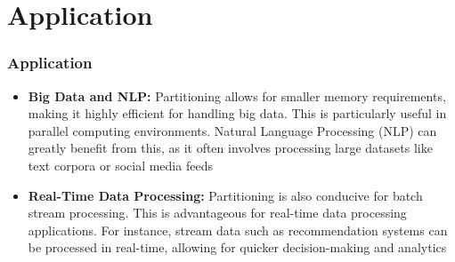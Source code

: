 \documentclass{beamer}
\begin{document}

\section{Application}
\begin{frame}
    \frametitle{Application}
    \begin{itemize}
        \item \textbf{Big Data and NLP:} Partitioning allows for smaller memory requirements, making it highly efficient for handling big data. This is particularly useful in parallel computing environments. Natural Language Processing (NLP) can greatly benefit from this, as it often involves processing large datasets like text corpora or social media feeds \cite{affeldt2020EnsembleBlockCoclustering}

        
        \item \textbf{Real-Time Data Processing:} Partitioning is also conducive for batch stream processing. This is advantageous for real-time data processing applications. For instance, stream data such as recommendation systems can be processed in real-time, allowing for quicker decision-making and analytics \cite{zheng2017SupervisedAdaptiveIncremental}
    \end{itemize}
    \scriptsize
    
    
\end{frame}
\end{document}
